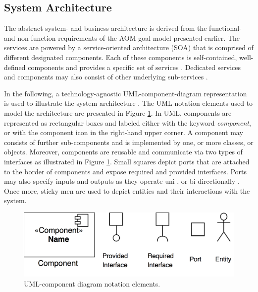 \documentclass{llncs}
\begin{document}
{		\subsection{System Architecture}
			\label{ss:component-diagrams}

			The abstract system- and business architecture is derived from the functional- and non-function requirements of the AOM goal model presented earlier. The services are powered by a service-oriented architecture (SOA) that is comprised of different designated components. Each of these components is self-contained, well-defined components and provides a specific set of services \cite{erl2005service}\cite{perrey2003service}. Dedicated services and components may also consist of other underlying sub-services \cite{rosen2012applied}. 
			
			In the following, a technology-agnostic UML-component-diagram representation is used to illustrate the system architecture \cite{booch1996unified}\cite{specification2007omg}. The UML notation elements used to model the architecture are presented in Figure \ref{fig:uml-component-diagram-overview}. In UML, components are represented as rectangular boxes and labeled either with the keyword \textit{component}, or with the component icon in the right-hand upper corner. A component may consists of further sub-components and is implemented by one, or more classes, or objects. Moreover, components are reusable and communicate via two types of interfaces as illustrated in Figure \ref{fig:uml-component-diagram-overview}. Small squares depict ports that are attached to the border of components and expose required and provided interfaces. Ports may also specify inputs and outputs as they operate uni-, or bi-directionally \cite{booch1996unified}\cite{specification2007omg}. Once more, sticky men are used to depict entities and their interactions with the system. 
			
			\begin{figure}[H]
				\centering
				\includegraphics[scale=0.15]{Figures/UML-notation-elements.png}
				\caption{UML-component diagram notation elements.}	
				\label{fig:uml-component-diagram-overview}
			\end{figure}	
			
}
\end{document}
